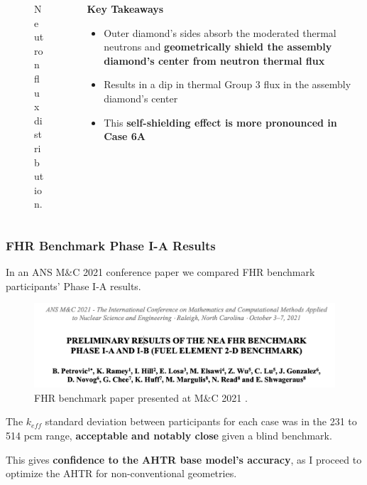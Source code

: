 \begin{frame}
\begin{columns}
\begin{column}{0.5\textwidth}
\begin{figure}
                \caption{Neutron flux distribution.}
            \end{figure}
        \end{column}
        \begin{column}{0.5\textwidth}
            \textbf{Key Takeaways} 
            \begin{itemize}
                \item Outer diamond's sides absorb the moderated thermal neutrons and 
                \textbf{geometrically shield the assembly diamond's center from neutron 
                thermal flux}
                \item Results in a dip in thermal Group 3 flux in the assembly 
                diamond's center
                \item This \textbf{self-shielding effect is more pronounced in Case 6A} 
            \end{itemize}
        \end{column}
    \end{columns}
\end{frame}

\begin{frame}
    \frametitle{FHR Benchmark Phase I-A Results}
    In an ANS M$\&$C 2021 conference paper we compared FHR benchmark participants' 
    Phase I-A results. 
    \begin{figure}[]
        \centering
        \includegraphics[width=0.85\linewidth]{figures/mnc.png} 
        \caption{FHR benchmark paper presented at M$\&$C 2021 
        \cite{petrovic_preliminary_2021}.}
    \end{figure}

    The $k_{eff}$ standard deviation between participants for each case was in the 
    231 to 514 pcm range, \textbf{acceptable and notably close} given a blind benchmark.

    \vspace{0.2cm}
    This gives \textbf{confidence to the AHTR base model's accuracy}, as I 
    proceed to optimize the AHTR for non-conventional geometries. 
\end{frame}

